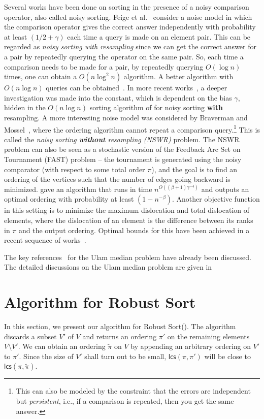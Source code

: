 \documentclass[11pt]{llncs}
\newcommand{\tpi}{{\widetilde \pi}}
\newcommand{\robust}{{\textsf{Robust Sort}}\xspace}
\newcommand{\lcs}{{\textsf{lcs}}}
\begin{document}
Several works have been done on sorting in the presence of a noisy comparison operator, also called noisy sorting. Feige et al.~\cite{FRPU94} consider a noise model in which the comparison operator gives the correct answer independently with probability at least $(1/2 + \gamma)$ each time a query is made on an element pair. This can be regarded as {\em noisy sorting with resampling} since we can get the correct answer for a pair by repeatedly querying the operator on the same pair. So, each time a comparison needs to be made for a pair, by repeatedly querying $O(\log{n})$ times, one can obtain a $O(n \log^2{n})$ algorithm. 
A better algorithm with $O(n \log{n})$ queries can be obtained~\cite{FRPU94,kk07}.
In more recent works~\cite{wgw22,gx23}, a deeper investigation was made into the constant, which is dependent on the bias $\gamma$, hidden in the $O(n \log{n})$ sorting algorithm of \cite{FRPU94} for noisy sorting {\bf with} resampling.
A more interesting noise model was considered by Braverman and Mossel~\cite{bm08}, where the ordering algorithm cannot repeat a comparison query.\footnote{This can also be modeled by the constraint that the errors are independent but {\em persistent}, i.e., if a comparison is repeated, then you get the same answer.}
This is called the {\em noisy sorting \textbf{without} resampling (NSWR)} problem. The NSWR problem can also be seen as a stochastic version of the Feedback Arc Set on Tournament (FAST) problem -- the tournament is generated using the noisy comparator (with respect to some total order $\pi$), and the goal is to find an ordering of the vertices such that the number of edges going backward is minimized. \cite{bm08} gave an algorithm that runs in time $n^{O((\beta+1)\gamma^{-4})}$ and outputs an optimal ordering with probability at least $(1-n^{-\beta})$. Another objective function in this setting is to minimize the maximum dislocation and total dislocation of elements, where the dislocation of an element is the difference between its ranks in $\pi$ and the output ordering. 
Optimal bounds for this have been achieved in a recent sequence of works~\cite{gllp20,gllp19}.

The key references~\cite{cdk21,cdk23} for the Ulam median problem have already been discussed. The detailed discussions on the Ulam median problem are given in ~


\section{Algorithm for \robust}\label{sec:robustsort}
In this section, we present our algorithm for \robust (). The algorithm discards a subset $V'$ of $V$ and returns an ordering $\pi'$ on the remaining elements $V \setminus V'$. We can obtain an ordering $\tpi$ on $V$ by appending an arbitrary ordering on $V'$ to $\pi'$. Since the size of $V'$ shall turn out to be small, $\lcs(\pi, \pi')$ will be close to $\lcs(\pi, \tpi)$. 
\end{document}
